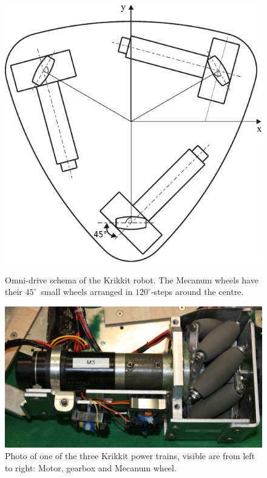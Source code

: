 \documentclass[12pt,a4paper]{article}
\begin{document}
\begin{figure}[hb]
  \begin{minipage}{0.45\textwidth}
   \centering
    \includegraphics[width=1\textwidth]{figures/krikkit_drive_angles}
    \caption{\label{fig:omnidrive}Omni-drive schema of the Krikkit robot. The Mecanum wheels have their $45^\circ$~small wheels arranged in $120^\circ${-}steps around the centre.
    \cite{mecanum2007}}
  \end{minipage}\hfill
  \begin{minipage}{0.45\textwidth}
   \centering
    \includegraphics[width=1\textwidth]{figures/Omniwheel_drive.png}
    \caption{\label{fig:mec-wheel}Photo of one of the three Krikkit power trains, visible are from left to right: Motor, gearbox and Mecanum wheel.}
  \end{minipage}
\end{figure}
\end{document}
